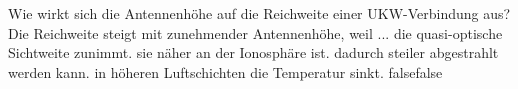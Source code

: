     {Wie wirkt sich die Antennenhöhe auf die Reichweite einer UKW-Verbindung aus? Die Reichweite steigt mit zunehmender Antennenhöhe, weil ...}
    {die quasi-optische Sichtweite zunimmt.}
    {sie näher an der Ionosphäre ist.}
    {dadurch steiler abgestrahlt werden kann.}
    {in höheren Luftschichten die Temperatur sinkt.}
    {false}{false}